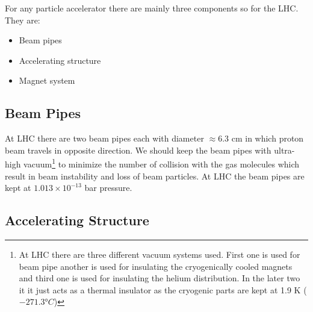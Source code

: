 For any particle accelerator there are mainly three components so for the LHC. They are:
\begin{itemize}
  \item Beam pipes
  \item Accelerating structure
  \item Magnet system
\end{itemize}

\subsection{Beam Pipes} %
\label{sub:beam_pipes}

At LHC there are two beam pipes each with diameter $\approx$6.3 cm in which proton beam travels in opposite direction. We should keep the beam pipes with ultra-high vacuum\footnote{At LHC there are three different vacuum systems used. First one is used for beam pipe another is used for insulating the cryogenically cooled magnets and third one is used for insulating the helium distribution. In the later two it it just acts as a thermal insulator as the cryogenic parts are kept at 1.9 K ($\ang{-271.3}C$)} to minimize the number of collision with the gas molecules which result in beam instability and loss of beam particles. At LHC the beam pipes are kept at $1.013 \times 10^{-13}$ bar pressure.

\subsection{Accelerating Structure} %
\label{sub:accelerating_structure}

